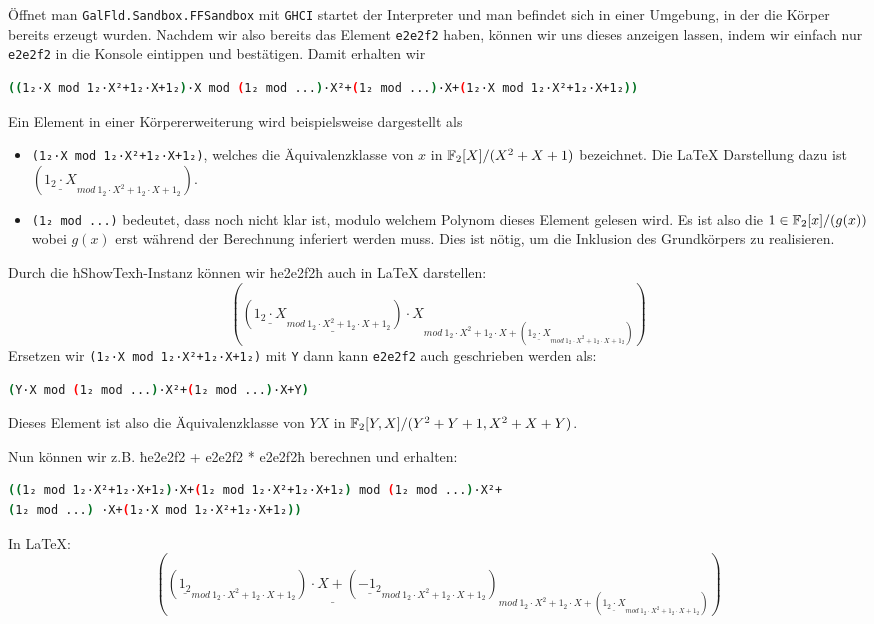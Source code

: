 Öffnet man \texttt{GalFld.Sandbox.FFSandbox} mit \texttt{GHCI} startet der
Interpreter und man befindet sich in einer Umgebung, in der die Körper bereits
erzeugt wurden. Nachdem wir also bereits das Element \texttt{e2e2f2} haben,
können wir uns dieses anzeigen lassen, indem wir einfach nur \texttt{e2e2f2} in
die Konsole eintippen und bestätigen. Damit erhalten wir
\begin{lstlisting}[language=bash
                  ,numbers=none
                  ,backgroundcolor=\color{lightgray}]
((1₂·X mod 1₂·X²+1₂·X+1₂)·X mod (1₂ mod ...)·X²+(1₂ mod ...)·X+(1₂·X mod 1₂·X²+1₂·X+1₂))
\end{lstlisting}
Ein Element in einer Körpererweiterung wird beispielsweise dargestellt als
\begin{itemize}
  \item \texttt{(1₂·X mod 1₂·X²+1₂·X+1₂)}, welches die Äquivalenzklasse von $x$
  in $\mathbb{F}_2[X]/(X^2+X+1)$ bezeichnet. Die \LaTeX{} Darstellung dazu ist 
  $\left(
      \underline{
        1_{2}
        \cdot{}X
      }_{
        mod~1_{2} \cdot{}X^{2}+1_{2}\cdot{}X+1_{2}
      }
    \right)$.
  \item \texttt{(1₂ mod ...)} bedeutet, dass noch nicht klar ist, modulo
  welchem Polynom dieses Element gelesen wird. Es ist also die
  $1\in\mathbb{F}_2[x]/(g(x))$
  wobei $g(x)$ erst während der Berechnung inferiert werden muss.
  Dies ist nötig, um die Inklusion des Grundkörpers zu realisieren.
\end{itemize}
Durch die ħShowTexħ-Instanz können wir ħe2e2f2ħ auch in \LaTeX{} darstellen:
\[
\left(
  \underline{
    \left(
      \underline{
        1_{2}
        \cdot{}X
      }_{
        mod~1_{2} \cdot{}X^{2}+1_{2}\cdot{}X+1_{2}
      }
    \right)\cdot{}X
  }_{
    mod~1_{2}\cdot{}X^{2}+1_{2}\cdot{}X+\left(
      \underline{
        1_{2}\cdot{}X
      }_{
        mod~1_{2}\cdot{}X^{2}+1_{2}\cdot{}X+1_{2}
      }
    \right)
  }
\right)
\]
Ersetzen wir \texttt{(1₂·X mod 1₂·X²+1₂·X+1₂)} mit \texttt{Y} dann kann
\texttt{e2e2f2} auch geschrieben werden als:
\begin{lstlisting}[language=bash
                  ,numbers=none
                  ,backgroundcolor=\color{lightgray}]
(Y·X mod (1₂ mod ...)·X²+(1₂ mod ...)·X+Y)
\end{lstlisting}
Dieses Element ist also die Äquivalenzklasse von $YX$ in
$\mathbb{F}_2[Y,X]/(Y^2+Y+1,X^2+X+Y)$.

Nun können wir z.B.
ħe2e2f2 + e2e2f2 * e2e2f2ħ berechnen und erhalten:
\begin{lstlisting}[language=bash
                  ,numbers=none
                  ,backgroundcolor=\color{lightgray}]
((1₂ mod 1₂·X²+1₂·X+1₂)·X+(1₂ mod 1₂·X²+1₂·X+1₂) mod (1₂ mod ...)·X²+
(1₂ mod ...) ·X+(1₂·X mod 1₂·X²+1₂·X+1₂))
\end{lstlisting}
In \LaTeX{}:
\[
\left(
  \underline{
    \left(
      \underline{
        1_{2}
      }_{
        mod~1_{2}\cdot{}X^{2}+1_{2}\cdot{}X+1_{2}
      }
    \right)
    \cdot{}X+\left(
      \underline{
        -1_{2}
      }_{
        mod~1_{2}\cdot{}X^{2}+1_{2}\cdot{}X+1_{2}
      }
    \right)
  }_{
    mod~1_{2}\cdot{}X^{2}+1_{2}\cdot{}X+\left(
      \underline{
        1_{2}\cdot{}X
      }_{
        mod~1_{2}\cdot{}X^{2}+1_{2}\cdot{}X+1_{2}
      }
    \right)
  }
  \right)
\]


